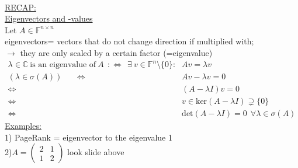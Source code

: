 \begin{frame}
	~\\
	{\blank
		\underline{RECAP:}\\
		\underline{Eigenvectors and -values}\\
		Let $A\in\mathbb{F}^{n\times n}$\\
		eigenvectors= vectors that do not change direction if multiplied with;\\
		$\rightarrow$ they are only scaled by a certain factor (=eigenvalue)
		\begin{align*}
		\lambda\in\mathbb{C}~\text{is an eigenvalue of}~A~~:\Leftrightarrow~~\exists~v\in\mathbb{F}^n\setminus\{0\}:~&Av=\lambda v\\
		(\lambda\in\sigma(A))~~~~~~~\Leftrightarrow~~&Av-\lambda v=0\\
		\Leftrightarrow~~&(A-\lambda I)v=0\\
		\Leftrightarrow~~&v\in\text{ker}(A-\lambda I)\supsetneq\{0\}\\
		\Leftrightarrow~~&\text{det}(A-\lambda I) = 0~~\forall\lambda\in\sigma(A)
		\end{align*}
		\underline{Examples:}\\
		1) PageRank = eigenvector to the eigenvalue 1\\
		2)$A=\begin{pmatrix}2&1\\1&2\end{pmatrix}$ look slide above
	}
\end{frame}